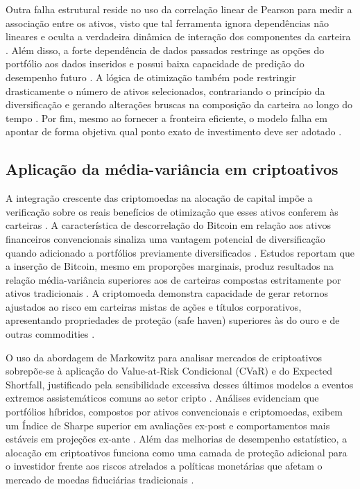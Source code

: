 Outra falha estrutural reside no uso da correlação linear de Pearson para medir a associação entre os ativos, visto que tal ferramenta ignora dependências não lineares e oculta a verdadeira dinâmica de interação dos componentes da carteira \cite{jeleskovic2024cryptocurrency}. Além disso, a forte dependência de dados passados restringe as opções do portfólio aos dados inseridos e possui baixa capacidade de predição do desempenho futuro \cite{chaweewanchon2022markowitz,jeleskovic2024cryptocurrency}. A lógica de otimização também pode restringir drasticamente o número de ativos selecionados, contrariando o princípio da diversificação e gerando alterações bruscas na composição da carteira ao longo do tempo \cite{jeleskovic2024cryptocurrency}. Por fim, mesmo ao fornecer a fronteira eficiente, o modelo falha em apontar de forma objetiva qual ponto exato de investimento deve ser adotado \cite{paiva2019decision}.

\subsection{Aplicação da média-variância em criptoativos}
\label{subsec_aplicacao_da_media_variancia_em_criptoativos}

A integração crescente das criptomoedas na alocação de capital impõe a verificação sobre os reais benefícios de otimização que esses ativos conferem às carteiras \cite{jeleskovic2024cryptocurrency}. A característica de descorrelação do Bitcoin em relação aos ativos financeiros convencionais sinaliza uma vantagem potencial de diversificação quando adicionado a portfólios previamente diversificados \cite{bakry2021bitcoin}. Estudos reportam que a inserção de Bitcoin, mesmo em proporções marginais, produz resultados na relação média-variância superiores aos de carteiras compostas estritamente por ativos tradicionais \cite{bakry2021bitcoin}. A criptomoeda demonstra capacidade de gerar retornos ajustados ao risco em carteiras mistas de ações e títulos corporativos, apresentando propriedades de proteção (safe haven) superiores às do ouro e de outras commodities \cite{bakry2021bitcoin}.

O uso da abordagem de Markowitz para analisar mercados de criptoativos sobrepõe-se à aplicação do Value-at-Risk Condicional (CVaR) e do Expected Shortfall, justificado pela sensibilidade excessiva desses últimos modelos a eventos extremos assistemáticos comuns ao setor cripto \cite{jeleskovic2024cryptocurrency}. Análises evidenciam que portfólios híbridos, compostos por ativos convencionais e criptomoedas, exibem um Índice de Sharpe superior em avaliações ex-post e comportamentos mais estáveis em projeções ex-ante \cite{jeleskovic2024cryptocurrency}. Além das melhorias de desempenho estatístico, a alocação em criptoativos funciona como uma camada de proteção adicional para o investidor frente aos riscos atrelados a políticas monetárias que afetam o mercado de moedas fiduciárias tradicionais \cite{jeleskovic2024cryptocurrency}.
